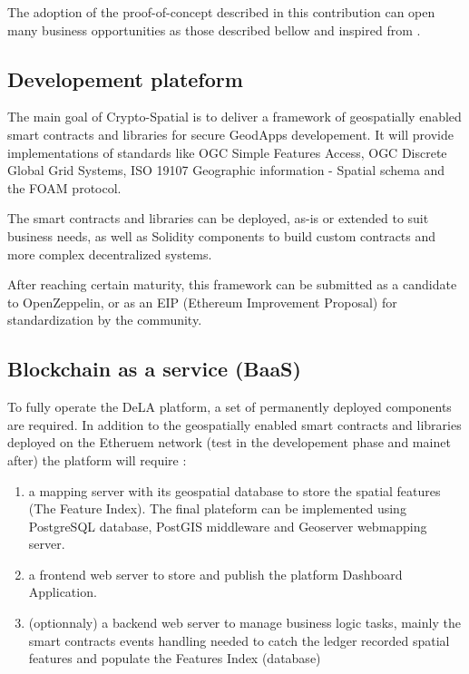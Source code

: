 \documentclass{isprs} %
\begin{document}
The adoption of the proof-of-concept described in this contribution can open many business opportunities as those described bellow and inspired from \cite{business_models}.

\subsection{Developement plateform}\label{sec:Developement plateform}

The main goal of Crypto-Spatial is to deliver a framework of geospatially enabled smart contracts and libraries for secure GeodApps developement. It will provide implementations of standards like OGC Simple Features Access, OGC Discrete Global Grid Systems, ISO 19107 Geographic information - Spatial schema \cite{iso2008iso} and the FOAM protocol.

The smart contracts and libraries can be deployed, as-is or extended to suit business needs, as well as Solidity components to build custom contracts and more complex decentralized systems. 

After reaching certain maturity, this framework can be submitted as a candidate to OpenZeppelin, or as an EIP (Ethereum Improvement Proposal) for standardization by the community.

\subsection{Blockchain as a service (BaaS)}\label{sec:Blockchain as a service (BaaS)}

To fully operate the DeLA platform, a set of permanently deployed components are required. In addition to the geospatially enabled smart contracts and libraries deployed on the Etheruem network (test in the developement phase and mainet after) the platform will require : 
\begin{enumerate}
\setlength\itemsep{0em}\setlength\parskip{0em}\setlength\topsep{0em}\setlength\partopsep{0em}\setlength\parsep{0em} 
\item{a mapping server with its geospatial database to store the spatial features (The Feature Index). The final plateform can be implemented using PostgreSQL database, PostGIS middleware and Geoserver webmapping server.} 
\item{a frontend web server to store and publish the platform Dashboard Application.}
\item{(optionnaly) a backend web server to manage business logic tasks, mainly the smart contracts events handling needed to catch the ledger recorded spatial features and populate the Features Index (database)}
\end{enumerate}
\end{document}
